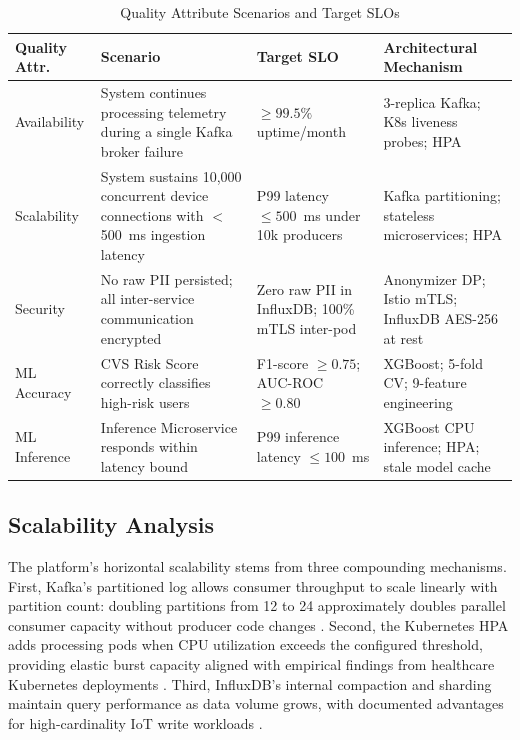 \documentclass[conference]{IEEEtran}
\begin{document}
\begin{table}[H]
  \centering
  \caption{Quality Attribute Scenarios and Target SLOs}
  \label{tab:slos}
  \begin{tabularx}{\textwidth}{p{2.5cm} p{4.5cm} p{3cm} p{3.5cm}}
    \toprule
    \textbf{Quality Attr.} & \textbf{Scenario} & \textbf{Target SLO} &
    \textbf{Architectural Mechanism} \\
    \midrule
    Availability & System continues processing telemetry during a single Kafka broker
      failure & $\geq 99.5\%$ uptime/month & 3-replica Kafka; K8s liveness probes; HPA \\
    \addlinespace
    Scalability & System sustains 10,000 concurrent device connections with
      $<$500~ms ingestion latency & P99 latency $\leq 500$~ms under 10k producers &
      Kafka partitioning; stateless microservices; HPA \\
    \addlinespace
    Security & No raw PII persisted; all inter-service communication encrypted &
      Zero raw PII in InfluxDB; 100\% mTLS inter-pod &
      Anonymizer DP; Istio mTLS; InfluxDB AES-256 at rest \\
    \addlinespace
    ML Accuracy & CVS Risk Score correctly classifies high-risk users &
      F1-score $\geq 0.75$; AUC-ROC $\geq 0.80$ &
      XGBoost; 5-fold CV; 9-feature engineering \\
    \addlinespace
    ML Inference & Inference Microservice responds within latency bound &
      P99 inference latency $\leq 100$~ms &
      XGBoost CPU inference; HPA; stale model cache \\
    \bottomrule
  \end{tabularx}
\end{table}

\subsection{Scalability Analysis}

The platform's horizontal scalability stems from three compounding mechanisms.
First, Kafka's partitioned log allows consumer throughput to scale linearly with
partition count: doubling partitions from 12 to 24 approximately doubles parallel
consumer capacity without producer code changes \cite{b10}. Second, the Kubernetes
HPA adds processing pods when CPU utilization exceeds the configured threshold,
providing elastic burst capacity aligned with empirical findings from healthcare
Kubernetes deployments \cite{b20}. Third, InfluxDB's internal compaction and sharding
maintain query performance as data volume grows, with documented advantages for
high-cardinality IoT write workloads \cite{b7}.
\end{document}
